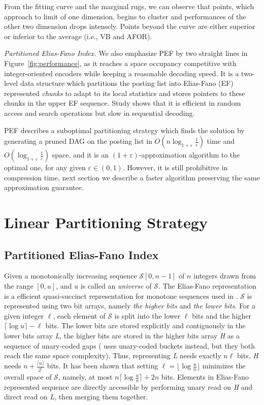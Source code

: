 \documentclass[runningheads,a4paper]{llncs}
\begin{document}
From the fitting curve and the marginal rugs, we can observe that points, which approach to limit of one dimension, begins to cluster and performances of the other two dimension drops intensely. Points beyond the curve are either superior or inferior to the average (i.e., VB and AFOR).

\textit{Partitioned Elias-Fano Index.}
We also emphasize PEF by two straight lines in Figure~\ref{fig:performance}, as it reaches a space occupancy competitive with integer-oriented encoders while keeping a reasonable decoding speed. It is a two-level data structure which partitions the posting list into Elias-Fano (EF) represented \textit{chunks} to adapt to its local statistics and stores pointers to these chunks in the upper EF sequence. Study shows that it is efficient in random access and search operations but slow in sequential decoding\cite{ottaviano2015optimal,vigna2013quasi}.

PEF describes a suboptimal partitioning strategy which finds the solution by generating a pruned DAG on the posting list in $O\left(n\log_{1+\varepsilon}\frac{1}{\varepsilon}\right)$ time and $O\left(\log_{1+\varepsilon}\frac{1}{\varepsilon}\right)$ space, and it is an $\left(1+\varepsilon\right)$-approximation algorithm to the optimal one, for any given $\varepsilon\in\left(0,1\right)$. However, it is still prohibitive in compression time, next section we describe a faster algorithm preserving the same approximation guarantee.

\section{Linear Partitioning Strategy}
\subsection{Partitioned Elias-Fano Index}
Given a monotonically increasing sequence $ \mathcal{S}[0,n-1] $ of $ n $ integers drawn from the range $ [0,u] $, and $ u $ is called an \textit{universe} of $ \mathcal{S} $. The Elias-Fano representation is a efficient quasi-succinct representation for monotone sequences used in \cite{elias1974efficient,vigna2013quasi}.
$ \mathcal{S} $ is represented using two bit arrays, namely \textit{the higher bits} and \textit{the lower bits}.
For a given integer $ \ell $, each element of $ \mathcal{S} $ is split into the lower $ \ell $ bits and the higher $ \lceil \log u \rceil - \ell$ bits.
The lower bits are stored explicitly and contiguously in the lower bits array \textit{L}, the higher bits are stored in the higher bits array \textit{H} as a sequence of unary-coded gaps (\cite{ottaviano2014partitioned} uses unary-coded buckets instead, but they both reach the same space complexity).
Thus, representing \textit{L} needs exactly $ n\ell $ bits, \textit{H} needs $ n + \frac{\lceil u \rceil}{2^{\ell}} $ bits. It has been shown that setting $ \ell = \lfloor \log \frac{u}{n} \rfloor $ minimizes the overall space of $ \mathcal{S} $, namely, at most $ n \lceil \log \frac{u}{n} \rceil + 2 n $ bits. Elements in Elias-Fano represented sequence are directly accessible by performing unary read on \textit{H} and direct read on \textit{L}, then merging them together.
\end{document}
